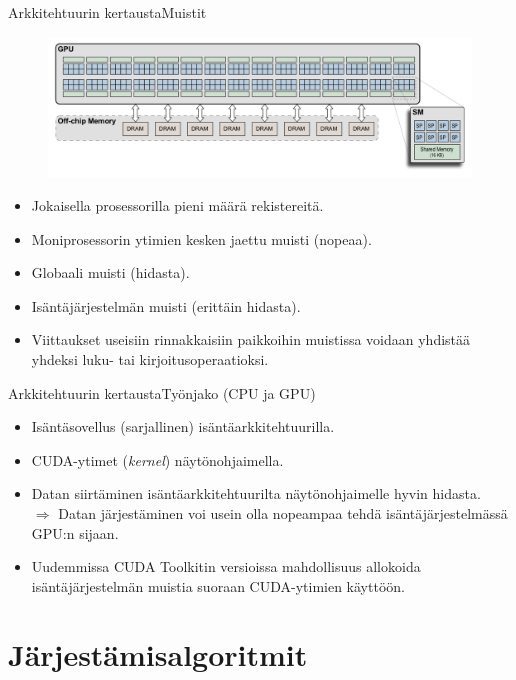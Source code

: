 \documentclass{beamer}
\begin{document}
\begin{frame}{Arkkitehtuurin kertausta}{Muistit}
  \begin{figure}
    \includegraphics[scale=0.25]{geforce_gtx280.png}
  \end{figure}
    \begin{itemize}
    \item
      Jokaisella prosessorilla pieni määrä rekistereitä.
    \item
      Moniprosessorin ytimien kesken jaettu muisti (nopeaa).
    \item
      Globaali muisti (hidasta).
    \item
      Isäntäjärjestelmän muisti (erittäin hidasta).
    \item
      Viittaukset useisiin rinnakkaisiin paikkoihin muistissa voidaan yhdistää yhdeksi luku- tai kirjoitusoperaatioksi.
    \end{itemize}
\end{frame}

\begin{frame}{Arkkitehtuurin kertausta}{Työnjako (CPU ja GPU)}
    \begin{itemize}
    \item
      Isäntäsovellus (sarjallinen) isäntäarkkitehtuurilla.
    \item
      CUDA-ytimet (\emph{kernel}) näytönohjaimella.
    \item
      Datan siirtäminen isäntäarkkitehtuurilta näytönohjaimelle hyvin hidasta. \\ $\Rightarrow$ Datan järjestäminen voi usein olla nopeampaa tehdä isäntäjärjestelmässä GPU:n sijaan.
    \item
      Uudemmissa CUDA Toolkitin versioissa mahdollisuus allokoida isäntäjärjestelmän muistia suoraan CUDA-ytimien käyttöön.
    \end{itemize}
\end{frame}

\section{Järjestämisalgoritmit}
\end{document}
